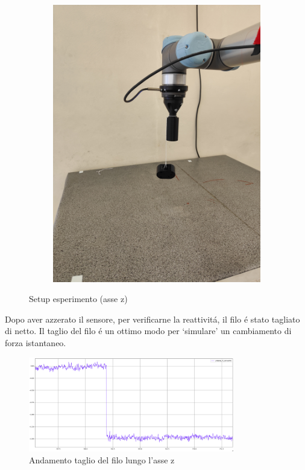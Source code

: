 \begin{figure}[H]
\begin{subfigure}[b]{0.4\textwidth}
        \includegraphics[width=\textwidth]{images/setup_z.jpg}
        \label{fig:rehab}
    \end{subfigure}
    \caption{Setup esperimento (asse z)}\label{fig:setup_z}
\end{figure}
Dopo aver azzerato il sensore, per verificarne la reattivit\'{a}, il filo \'{e} stato tagliato di netto. 
Il taglio del filo \'{e} un ottimo modo per `simulare' un cambiamento di forza istantaneo.
\begin{figure}[H]
    \centering
    \includegraphics*[width=0.8\textwidth]{images/z_cut.png}
    \caption{Andamento taglio del filo lungo l'asse z}
    \label{fig:z_cut}
\end{figure}
